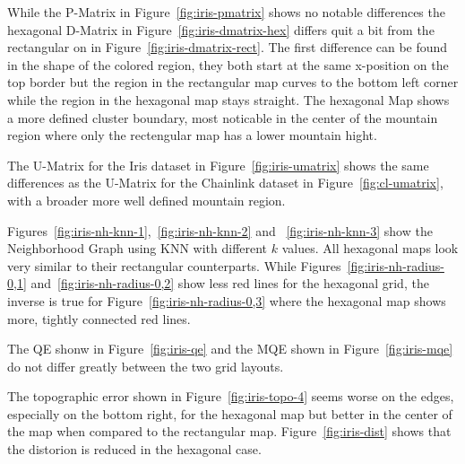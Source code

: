 \documentclass{acm_proc_article-sp}
\begin{document}
While the P-Matrix in Figure~\ref{fig:iris-pmatrix} shows no notable differences the hexagonal D-Matrix in Figure~\ref{fig:iris-dmatrix-hex} differs quit a bit from the rectangular on in Figure~\ref{fig:iris-dmatrix-rect}. The first difference can be found in the shape of the colored region, they both start at the same x-position on the top border but the region in the rectangular map curves to the bottom left corner while the region in the hexagonal map stays straight.
The hexagonal Map shows a more defined cluster boundary, most noticable in the center of the mountain region where only the rectengular map has a lower mountain hight.

The U-Matrix for the Iris dataset in Figure~\ref{fig:iris-umatrix} shows the same differences as the U-Matrix for the Chainlink dataset in Figure~\ref{fig:cl-umatrix}, with a broader more well defined mountain region.


Figures~\ref{fig:iris-nh-knn-1},~\ref{fig:iris-nh-knn-2} and ~\ref{fig:iris-nh-knn-3} show the Neighborhood Graph using KNN with different $k$ values. All hexagonal maps look very similar to their rectangular counterparts.
While Figures~\ref{fig:iris-nh-radius-0,1} and~\ref{fig:iris-nh-radius-0,2} show less red lines for the hexagonal grid, the inverse is true for Figure~\ref{fig:iris-nh-radius-0,3} where the hexagonal map shows more, tightly connected red lines.


The QE shonw in Figure~\ref{fig:iris-qe} and the MQE shown in Figure~\ref{fig:iris-mqe} do not differ greatly between the two grid layouts.



The topographic error shown in Figure~\ref{fig:iris-topo-4} seems worse on the edges, especially on the bottom right, for the hexagonal map but better in the center of the map when compared to the rectangular map.
Figure~\ref{fig:iris-dist} shows that the distorion is reduced in the hexagonal case.
\end{document}
